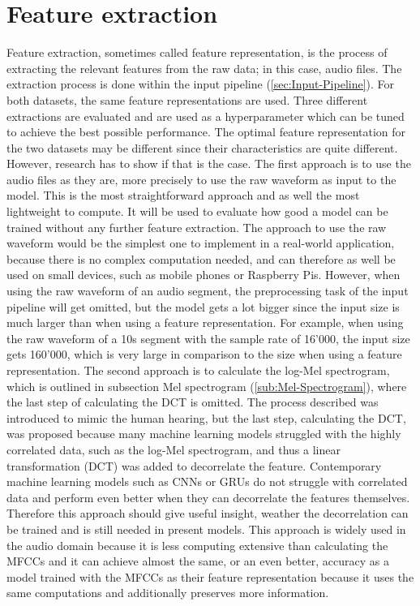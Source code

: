 \section{Feature extraction}
\label{sec:Feature-Extraction}
Feature extraction, sometimes called feature representation, is the process of extracting the relevant features from the raw data; in this case, audio files. The extraction process is done within the input pipeline (\ref{sec:Input-Pipeline}). For both datasets, the same feature representations are used. Three different extractions are evaluated and are used as a hyperparameter which can be tuned to achieve the best possible performance. The optimal feature representation for the two datasets may be different since their characteristics are quite different. However, research has to show if that is the case.
\newline
\newline
The first approach is to use the audio files as they are, more precisely to use the raw waveform as input to the model. This is the most straightforward approach and as well the most lightweight to compute. It will be used to evaluate how good a model can be trained without any further feature extraction. The approach to use the raw waveform would be the simplest one to implement in a real-world application, because there is no complex computation needed, and can therefore as well be used on small devices, such as mobile phones or Raspberry Pis. However, when using the raw waveform of an audio segment, the preprocessing task of the input pipeline will get omitted, but the model gets a lot bigger since the input size is much larger than when using a feature representation. For example, when using the raw waveform of a 10s segment with the sample rate of 16'000, the input size gets 160'000, which is very large in comparison to the size when using a feature representation.
\newline
\newline
The second approach is to calculate the log-Mel spectrogram, which is outlined in subsection Mel spectrogram (\ref{sub:Mel-Spectrogram}), where the last step of calculating the \gls{DCT} is omitted. The process described was introduced to mimic the human hearing, but the last step, calculating the \gls{DCT}, was proposed because many machine learning models struggled with the highly correlated data, such as the log-Mel spectrogram, and thus a linear transformation (\gls{DCT}) was added to decorrelate the feature. Contemporary machine learning models such as \glspl{CNN} or \glspl{GRU} do not struggle with correlated data and perform even better when they can decorrelate the features themselves. Therefore this approach should give useful insight, weather the decorrelation can be trained and is still needed in present models. This approach is widely used in the audio domain because it is less computing extensive than calculating the \glspl{MFCC} and it can achieve almost the same, or an even better, accuracy as a model trained with the \glspl{MFCC} as their feature representation because it uses the same computations and additionally preserves more information.
